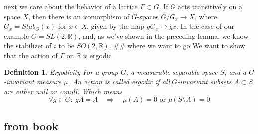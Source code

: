 \documentclass[
  12pt
]{article}
\theoremstyle{break}
\newtheorem{defn}{Definition}
\theoremstyle{plain}
\begin{document}
  next we care about the behavior of a lattice $\Gamma \subset G$. If
  $G$ acts transitively on a space $X$, then there is an isomorphism
  of $G$-spaces $G/G_x \rightarrow X$, where $G_x = Stab_G (x)$ for
  $x \in X$, given by the map $gG_x \mapsto gx$. In the case of our
  example $G = SL(2, \mathbb{R})$, and, as we've shown in the preceding
  lemma, we know the stabilizer of $i$ to be $SO(2,\mathbb{R})$. \#\#
  where we want to go We want to show that the action of $\Gamma$ on
  $\bar{\mathbb{R}}$ is ergodic

  \begin{defn}{Ergodicity}
  For a group $G$, a measurable separable space $S$, and a $G$-invariant measure $\mu$. An action is called ergodic if all $G$-invariant subsets $A\subset S$ are either null or conull. Which means 
  $$
  \forall g\in G:\ gA = A \quad \Rightarrow \quad \mu(A)=0 \text{ or } \mu(S\setminus A)=0
  $$
  \end{defn}

  \hypertarget{from-book}{%
  \subsection{from book}\label{from-book}}
\end{document}

